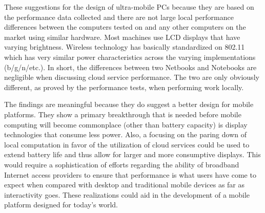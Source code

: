 These suggestions for the design of ultra-mobile PCs because they are based on
the performance data collected and there are not large local performance
differences between the computers tested on and any other computers on the
market using similar hardware.  Most machines use LCD displays that have varying
brightness.  Wireless technology has basically standardized on 802.11 which has
very similar power characteristics across the varying implementations
(b/g/n/etc.).  In short, the differences between two Netbooks and Notebooks are
negligible when discussing cloud service performance.  The two are only
obviously different, as proved by the performance tests, when performing work
locally.


The findings are meaningful because they do suggest a better design for mobile
platforms.  They show a primary breakthrough that is needed before mobile
computing will become commonplace (other than battery capacity) is display
technologies that consume less power.  Also, a focusing on the paring down of
local computation in favor of the utilization of cloud services could be used to
extend battery life and thus allow for larger and more consumptive displays.
This would require a sophistication of efforts regarding the ability of
broadband Internet access providers to ensure that performance is what users
have come to expect when compared with desktop and traditional mobile devices as
far as interactivity goes.  These realizations could aid in the development of a
mobile platform designed for today's world.


